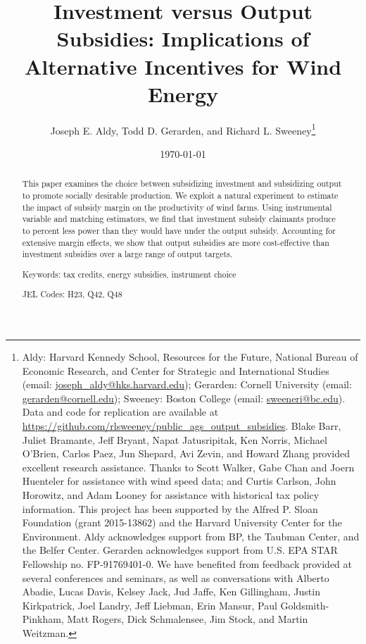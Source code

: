 \documentclass[12pt]{article}
\begin{document}
\title{Investment versus Output Subsidies: Implications of Alternative Incentives for Wind Energy}

\author{Joseph E. Aldy, Todd D. Gerarden, and Richard L. Sweeney\thanks{Aldy: Harvard Kennedy School, Resources for the Future, National Bureau of Economic Research, and Center for Strategic and International Studies (email: \href{mailto:joseph_aldy@hks.harvard.edu}{joseph\_{}aldy@hks.harvard.edu}); Gerarden: Cornell University (email: \href{mailto:gerarden@cornell.edu}{gerarden@cornell.edu}); Sweeney: Boston College (email: \href{mailto:sweeneri@bc.edu}{sweeneri@bc.edu}). Data and code for replication are available at \href{https://github.com/rlsweeney/public_ags_output_subsidies}{https://github.com/rlsweeney/public\_ags\_output\_subsidies}. Blake Barr, Juliet Bramante, Jeff Bryant, Napat Jatusripitak, Ken Norris, Michael O'Brien, Carlos Paez, Jun Shepard, Avi Zevin, and Howard Zhang provided excellent research assistance. Thanks to Scott Walker, Gabe Chan and Joern Huenteler for assistance with wind speed data; and Curtis Carlson, John Horowitz, and Adam Looney for assistance with historical tax policy information. This project has been supported by the Alfred P. Sloan Foundation (grant 2015-13862) and the Harvard University Center for the Environment. Aldy acknowledges support from BP, the Taubman Center, and the Belfer Center. Gerarden acknowledges support from U.S. EPA STAR Fellowship no. FP-91769401-0. We have benefited from feedback provided at several conferences and seminars, as well as conversations with Alberto Abadie, Lucas Davis, Kelsey Jack, Jud Jaffe, Ken Gillingham, Justin Kirkpatrick, Joel Landry, Jeff Liebman, Erin Mansur, Paul Goldsmith-Pinkham, Matt Rogers, Dick Schmalensee, Jim Stock, and Martin Weitzman.}}


\date{\monthyeardate\today}
\maketitle
\begin{abstract}
\noindent This paper examines the choice between subsidizing investment and subsidizing output to promote socially desirable production. We exploit a natural experiment to estimate the impact of subsidy margin on the productivity of wind farms. Using instrumental variable and matching estimators, we find that investment subsidy claimants produce  \unskip to percent less power than they would have under the output subsidy. Accounting for extensive margin effects, we show that output subsidies are more cost-effective than investment subsidies over a large range of output targets. 

\vspace{1cm}

\noindent Keywords: tax credits, energy subsidies, instrument choice

\noindent JEL Codes: H23, Q42, Q48

\vspace{1cm}
\end{abstract}
\end{document}
